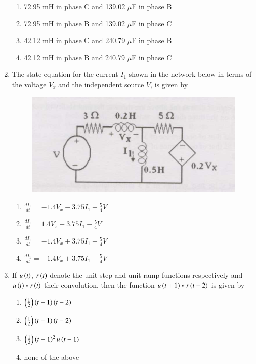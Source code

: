 \documentclass[journal]{IEEEtran}
\begin{document}
\begin{enumerate}
\begin{enumerate}
    \item 72.95 mH in phase C and 139.02 $\mu$F in phase B
    \item 72.95 mH in phase B and 139.02 $\mu$F in phase C
    \item 42.12 mH in phase C and 240.79 $\mu$F in phase B
    \item 42.12 mH in phase B and 240.79 $\mu$F in phase C \\
\end{enumerate}
\item The state equation for the current $I_1$ shown in the network below in terms of the voltage $V_x$ and the independent source $V$, is given by
\begin{figure}[h!]
	    \centering
	    \includegraphics[width=0.7\linewidth]{figs/Q16.png}
     \end{figure}
\begin{enumerate}
    \item $\frac{dI_1}{dt} = -1.4V_x - 3.75I_1 + \frac{5}{4}V$
    \item $\frac{dI_1}{dt} = 1.4V_x - 3.75I_1 - \frac{5}{4}V$
    \item $\frac{dI_1}{dt} = -1.4V_x + 3.75I_1 + \frac{5}{4}V$
    \item $\frac{dI_1}{dt} = -1.4V_x + 3.75I_1 - \frac{5}{4}V$
\end{enumerate}
\item If $u\left(t\right)$, $r\left(t\right)$ denote the unit step and unit ramp functions respectively and $u\left(t\right)*r\left(t\right)$ their convolution, then the function $u\left(t+1\right)*r\left(t-2\right)$ is given by
\begin{enumerate}
    \item $\left(\frac{1}{2}\right)\left(t-1\right)\left(t-2\right)$
    \item $\left(\frac{1}{2}\right)\left(t-1\right)\left(t-2\right)$
    \item $\left(\frac{1}{2}\right)\left(t-1\right)^2u\left(t-1\right)$
    \item none of the above
\end{enumerate}
			 \end{enumerate}
			 
\end{document}
